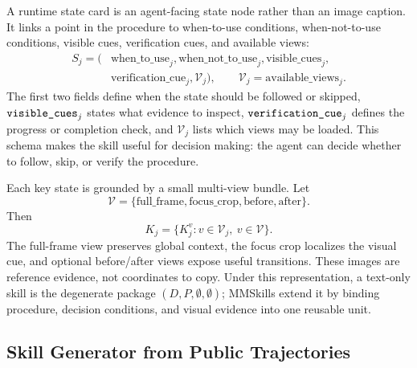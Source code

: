 A runtime state card is an agent-facing state node rather than an image caption. It links a point in the procedure to when-to-use conditions, when-not-to-use conditions, visible cues, verification cues, and available views:
\begin{equation}
\begin{split}
S_j = (&
\text{when\_to\_use}_j,
\text{when\_not\_to\_use}_j,
\text{visible\_cues}_j,\\
&
\text{verification\_cue}_j,
\mathcal{V}_j),
\qquad \mathcal{V}_j=\text{available\_views}_j .
\end{split}
\label{eq:state-card}
\end{equation}
The first two fields define when the state should be followed or skipped, $\text{\normalfont\ttfamily visible\_cues}_j$ states what evidence to inspect, $\text{\normalfont\ttfamily verification\_cue}_j$ defines the progress or completion check, and $\mathcal{V}_j$ lists which views may be loaded. This schema makes the skill useful for decision making: the agent can decide whether to follow, skip, or verify the procedure.

Each key state is grounded by a small multi-view bundle. Let
\begin{equation}
    \mathcal{V}=\{\text{full\_frame},\text{focus\_crop},\text{before},\text{after}\}.
\end{equation}
Then
\begin{equation}
    K_j=\{K_j^{v}:v\in\mathcal{V}_j,\ v\in\mathcal{V}\}.
    \label{eq:keyframe-bundle}
\end{equation}
The full-frame view preserves global context, the focus crop localizes the visual cue, and optional before/after views expose useful transitions. These images are reference evidence, not coordinates to copy. Under this representation, a text-only skill is the degenerate package $(D,P,\emptyset,\emptyset)$; MMSkills extend it by binding procedure, decision conditions, and visual evidence into one reusable unit.

\subsection{Skill Generator from Public Trajectories}
\label{sec:method-generator}

